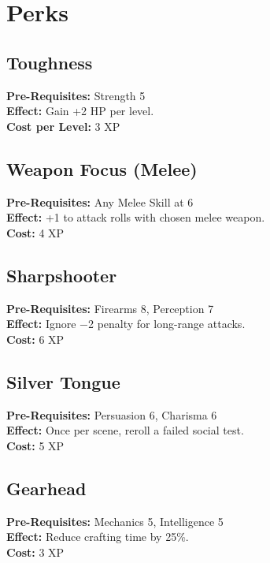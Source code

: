 \documentclass[12pt]{article}
\begin{document}
\section{Perks}
\begin{multicols}{2}

\subsection*{Toughness}
\textbf{Pre-Requisites:} Strength 5\\
\textbf{Effect:} Gain +2 HP per level.\\
\textbf{Cost per Level:} 3 XP

\medskip

\subsection*{Weapon Focus (Melee)}
\textbf{Pre-Requisites:} Any Melee Skill at 6\\
\textbf{Effect:} +1 to attack rolls with chosen melee weapon.\\
\textbf{Cost:} 4 XP

\medskip

\subsection*{Sharpshooter}
\textbf{Pre-Requisites:} Firearms 8, Perception 7\\
\textbf{Effect:} Ignore −2 penalty for long-range attacks.\\
\textbf{Cost:} 6 XP

\medskip

\subsection*{Silver Tongue}
\textbf{Pre-Requisites:} Persuasion 6, Charisma 6\\
\textbf{Effect:} Once per scene, reroll a failed social test.\\
\textbf{Cost:} 5 XP

\medskip

\subsection*{Gearhead}
\textbf{Pre-Requisites:} Mechanics 5, Intelligence 5\\
\textbf{Effect:} Reduce crafting time by 25\%.\\
\textbf{Cost:} 3 XP


\end{multicols}
\end{document}
